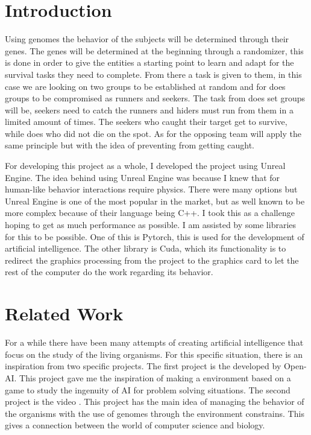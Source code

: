 \documentclass[10pt, letterpaper]{article}
\begin{document}
\begin{Form}
	\section{Introduction}
	Using genomes the behavior of the subjects will be determined through their genes.
	The genes will be determined at the beginning through a randomizer, this is done in order to give the
	entities a starting point to learn and adapt for the survival tasks they need to complete. From there a task
	is given to them, in this case we are looking on two groups to be established at random and for does groups
	to be compromised as runners and seekers. The task from does set groups will be, seekers need to catch the
	runners and hiders must run from them in a limited amount of times. The seekers who caught their target get to survive, while does
	who did not die on the spot. As for the opposing team will apply the same principle but with the idea of preventing
	from getting caught.

	For developing this project as a whole, I developed the project using Unreal Engine. The idea behind using Unreal
	Engine was because I knew that for human-like behavior interactions require physics. There were many options
	but Unreal Engine is one of the most popular in the market, but as well known to be more complex because
	of their language being C++. I took this as a challenge hoping to get as much performance as possible.
	I am assisted by some libraries for this to be possible. One of this is Pytorch, this is used for the development
	of artificial intelligence. The other library is Cuda, which its functionality is to redirect the graphics
	processing from the project to the graphics card to let the rest of the computer do the work regarding its behavior.

	\section{Related Work}
	For a while there have been many attempts of creating artificial intelligence that focus on the study of the living
	organisms. For this specific situation, there is an inspiration from two specific projects. The first project is the
	 \parencite{MultiAgentHideandSeek} developed by Open-AI. This project gave me the inspiration of making a environment based
	on a game to study the ingenuity of AI for problem solving situations. The second project is the video
	 \parencite{ProgrammedSomeCreatures}. This project has the main idea of managing the behavior of the organisms with the use
	of genomes through the environment constrains. This gives a connection between the world of computer science and biology.


\end{Form}
\end{document}
